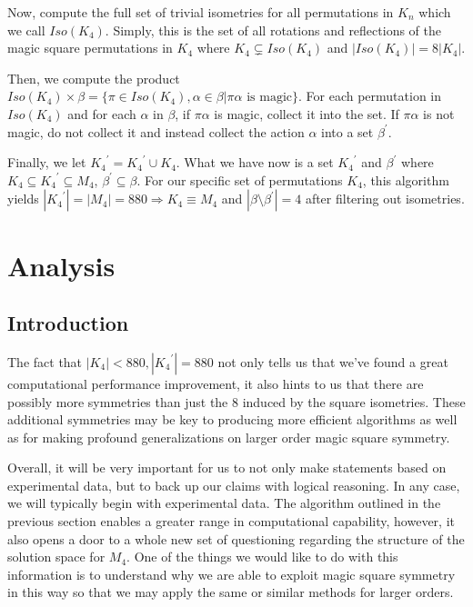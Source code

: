 \documentclass[12pt]{report}
\begin{document}
\par Now, compute the full set of trivial isometries for all permutations in $K_n$ which we call
$Iso(K_4)$. Simply, this is the set of all rotations and reflections of the magic square
permutations in $K_4$ where $K_4\subsetneq Iso(K_4)$ and $|Iso(K_4)| = 8|K_4|$.

\par Then, we compute the product $Iso(K_4)\times\beta = \{\pi\in Iso(K_4),\alpha\in\beta |
  \pi\alpha \text{ is magic}\}$. For each permutation in $Iso(K_4)$ and for each $\alpha$ in
$\beta$,
if $\pi\alpha$ is magic, collect it into the set. If $\pi\alpha$ is not magic, do not collect it
and instead collect the action $\alpha$ into a set ${\beta}^\prime$.

\par Finally, we let ${K_4}^\prime = {K_4}^\prime \cup K_4$. What we have now is a set
${K_4}^\prime$ and ${\beta}^\prime$ where $K_4 \subseteq {K_4}^\prime \subseteq M_4$,
${\beta}^\prime \subseteq \beta$. For our specific set of permutations $K_4$, this algorithm yields
$|{K_4}^\prime| = |M_4| = 880 \Rightarrow K_4 \equiv M_4$ and $|\beta \setminus{\beta}^\prime| = 4$
after filtering out isometries.

\chapter{Analysis}

\section{Introduction}

The fact that $\left|K_4\right|< 880, \left|{K_4}^\prime\right|=880$ not only tells us that we've
found a great computational performance improvement, it also hints to us that there are possibly
more symmetries than just the 8 induced by the square isometries. These additional symmetries may
be key to producing more efficient algorithms as well as for making profound generalizations on
larger order magic square symmetry.

\par Overall, it will be very important for us to not only make statements based on experimental
data, but to back up our claims with logical reasoning. In any case, we will typically begin with
experimental data. The algorithm outlined in the previous section enables a greater range in
computational capability, however, it also opens a door to a whole new set of questioning regarding
the structure of the solution space for $M_4$. One of the things we would like to do with this
information is to understand why we are able to exploit magic square symmetry in this way so that
we may apply the same or similar methods for larger orders.
\end{document}
